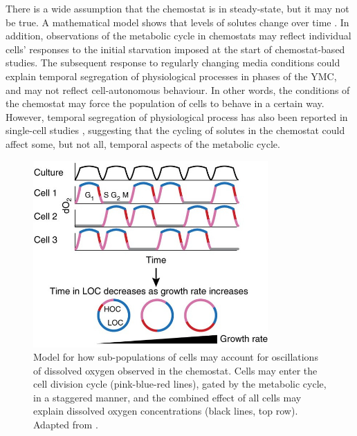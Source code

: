 There is a wide assumption that the chemostat is in steady-state, but it may not be true.
A mathematical model shows that levels of solutes change over time \parencite{jonesCyberneticModelGrowth1999}.
In addition, observations of the metabolic cycle in chemostats may reflect individual cells' responses to the initial starvation imposed at the start of chemostat-based studies.
The subsequent response to regularly changing media conditions could explain temporal segregation of physiological processes in phases of the YMC, and may not reflect cell-autonomous behaviour.
In other words, the conditions of the chemostat may force the population of cells to behave in a certain way.
However, temporal segregation of physiological process has also been reported in single-cell studies \parencite{takhaveevTemporalSegregationBiosynthetic2023}, suggesting that the cycling of solutes in the chemostat could affect some, but not all, temporal aspects of the metabolic cycle.

\begin{figure}
  \centering
  \includegraphics[width=0.8\textwidth]{mellorMolecularBasisMetabolic2016_3b_adapted}
  \caption[
    Model for how sub-populations of cells may account for oscillations of dissolved oxygen observed in the chemostat
  ]{
    Model for how sub-populations of cells may account for oscillations of dissolved oxygen observed in the chemostat.
    Cells may enter the cell division cycle (pink-blue-red lines), gated by the metabolic cycle, in a staggered manner, and the combined effect of all cells may explain dissolved oxygen concentrations (black lines, top row).
    Adapted from \textcite{mellorMolecularBasisMetabolic2016}.}
  \label{fig:intro-ymc-populations}
\end{figure}

